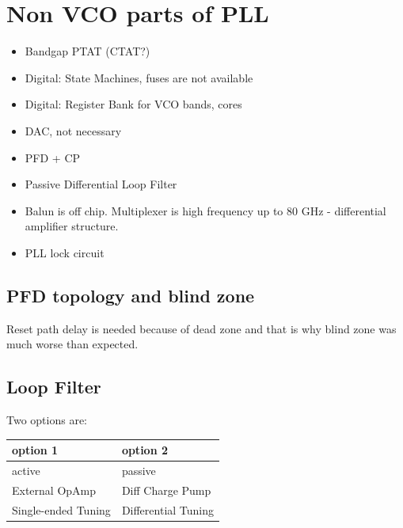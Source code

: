 \documentclass{article}
\begin{document}




\section{Non VCO parts of PLL}


\begin{itemize}
	\item Bandgap PTAT (CTAT?)  %
	\item Digital: State Machines, fuses are not available
	\item Digital: Register Bank for VCO bands, cores
	\item DAC, not necessary
	\item PFD + CP
	\item Passive Differential Loop Filter
	\item Balun is off chip. Multiplexer is high frequency up to 80 GHz - differential amplifier structure.
	\item PLL lock circuit
\end{itemize}

\subsection{PFD topology and blind zone } %


Reset path delay is needed because of dead zone and that is why blind zone was much worse than expected. %
\\

\subsection{Loop Filter}

Two options are:

\begin{table}[!ht]
    \centering
    \begin{tabular}{|l|l|}
    \hline
		option 1 & option 2 \\ \hline
        active & passive \\ \hline
        External OpAmp & Diff Charge Pump \\ \hline
        Single-ended Tuning & Differential Tuning \\ \hline
    \end{tabular}
\end{table}
\end{document}
